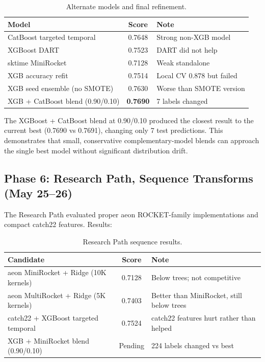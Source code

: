 \documentclass[12pt, a4paper]{article}
\begin{document}
\begin{table}[h]
\centering
\caption{Alternate models and final refinement.}
\label{tab:phase5}
\begin{tabular}{@{}lcl@{}}
\toprule
\textbf{Model} & \textbf{Score} & \textbf{Note} \\ \midrule
CatBoost targeted temporal & 0.7648 & Strong non-XGB model \\
XGBoost DART & 0.7523 & DART did not help \\
sktime MiniRocket & 0.7128 & Weak standalone \\
XGB accuracy refit & 0.7514 & Local CV 0.878 but failed \\
XGB seed ensemble (no SMOTE) & 0.7630 & Worse than SMOTE version \\
XGB + CatBoost blend (0.90/0.10) & \textbf{0.7690} & 7 labels changed \\ \bottomrule
\end{tabular}
\end{table}

The XGBoost + CatBoost blend at 0.90/0.10 produced the closest result to the current best (0.7690 vs 0.7691), changing only 7 test predictions. This demonstrates that small, conservative complementary-model blends can approach the single best model without significant distribution drift.

\subsection{Phase 6: Research Path, Sequence Transforms (May 25--26)}

The Research Path evaluated proper aeon ROCKET-family implementations and compact catch22 features. Results:

\begin{table}[h]
\centering
\caption{Research Path sequence results.}
\label{tab:phase6}
\begin{tabularx}{\textwidth}{@{} Y c Y @{}}
\toprule
\textbf{Candidate} & \textbf{Score} & \textbf{Note} \\ \midrule
aeon MiniRocket + Ridge (10K kernels) & 0.7128 & Below trees; not competitive \\
aeon MultiRocket + Ridge (5K kernels) & 0.7403 & Better than MiniRocket, still below trees \\
catch22 + XGBoost targeted temporal & 0.7524 & catch22 features hurt rather than helped \\
XGB + MiniRocket blend (0.90/0.10) & Pending & 224 labels changed vs best \\ \bottomrule
\end{tabularx}
\end{table}
\end{document}
